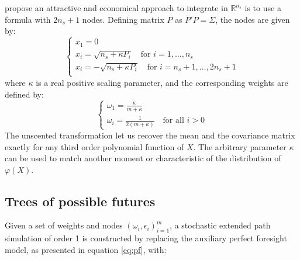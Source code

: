 \documentclass[a4paper,11pt]{amsart}
\begin{document}
\textcite{Julier2000} propose an attractive and economical approach to
integrate in $\mathbb R^{n_s}$ is to use a formula with \(2n_s + 1\)
nodes. Defining matrix $P$ as \(P'P=\Sigma\), the nodes are given by:
\[
   \begin{cases}
      x_1 = 0                                                            \\
      x_{i} = \sqrt{n_s+\kappa P_i}\quad\text{for }i=1,\dots,n_s         \\
      x_{i} = -\sqrt{n_s+\kappa P_i}\quad\text{for }i=n_s+1,\dots,2n_s+1 \\
   \end{cases}
\]
where $\kappa$ is a real positive scaling parameter, and the corresponding weights are defined by:
\[
   \begin{cases}
      \omega_1 = \frac{\kappa}{m+\kappa} \\
      \omega_i = \frac{1}{2(m+\kappa)}\quad\text{for all } i>0
   \end{cases}
\]
The unscented transformation let us recover the mean and the
covariance matrix exactly for any third order polynomial function
of $X$. The arbitrary parameter $\kappa$ can be used to match another
moment or characteristic of the distribution of $\varphi(X)$.\newline

\subsection{Trees of possible futures}

Given a set of weights and
nodes \((\omega_i, \epsilon_i)_{i=1}^m\), a stochastic extended path
simulation of order 1 is constructed by replacing the auxiliary
perfect foresight model, as presented in equation \eqref{eq:pf}, with:
\end{document}
